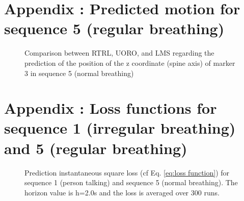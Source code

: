\documentclass[twocolumn,a4paper]{svjour3} \sloppy          \smartqed
\begin{document}
\onecolumn



\section{Appendix : Predicted motion for sequence 5 (regular breathing)}\label{appendix:coordz_marker3_seq5}

\begin{figure}[hbt!]
	
    \centering
    \quad
    \quad
    \caption{Comparison between RTRL, UORO, and LMS regarding the prediction of the position of the z coordinate (spine axis) of marker 3 in sequence 5 (normal breathing)}\label{fig:coordz_marker3_seq5}\end{figure}

\clearpage


\section{Appendix : Loss functions for sequence 1 (irregular breathing) and 5 (regular breathing)}\label{appendix:loss functions}

\begin{figure}[hbt!]
    \centering
    \quad
    \quad
    \quad
    \quad
    \quad
    \quad                  
    \caption{Prediction instantaneous square loss (cf Eq. \ref{eq:loss function}) for sequence 1 (person talking) and sequence 5 (normal breathing). The horizon value is h=2.0s and the loss is averaged over 300 runs. }
    \label{fig:loss function}
\end{figure}
\end{document}
